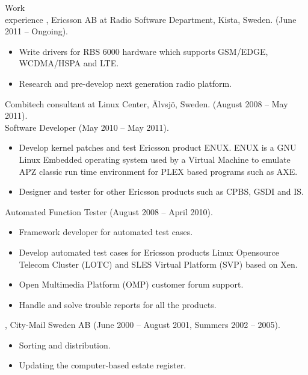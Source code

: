 \documentclass{../../cls/cv}
\author{Samuel Gabrielsson - Curriculum Vitae}
\begin{document}
\maketitle

\begin{category}{Work \\experience}
, Ericsson AB at Radio Software Department, Kista, Sweden. (June 2011 -- Ongoing).
\begin{itemize}
   \item Write drivers for RBS 6000 hardware which supports GSM/EDGE, WCDMA/HSPA and LTE.
   \item Research and pre-develop next generation radio platform.
\end{itemize}

 Combitech consultant at Linux Center, \"Alvsj\"o, Sweden. (August 2008 -- May 2011).\\
Software Developer (May 2010 -- May 2011).
\begin{itemize}
   \item Develop kernel patches and test Ericsson product ENUX. ENUX is a GNU Linux Embedded operating system used by a Virtual Machine to emulate APZ classic run time environment for PLEX based programs such as AXE.
   \item Designer and tester for other Ericsson products such as CPBS, GSDI and IS.
\end{itemize}
Automated Function Tester (August 2008 -- April 2010). 
\begin{itemize}
   \item Framework developer for automated test cases. 
   \item Develop automated test cases for Ericsson products Linux Opensource Telecom Cluster (LOTC) and SLES Virtual Platform (SVP) based on Xen.
   \item Open Multimedia Platform (OMP) customer forum support.
   \item Handle and solve trouble reports for all the products.
\end{itemize}


, City-Mail Sweden AB (June 2000 -- August 2001, Summers 2002 -- 2005). 
\begin{itemize}
   \item Sorting and distribution.
   \item Updating the computer-based estate register.
\end{itemize}


\end{category}
\end{document}
